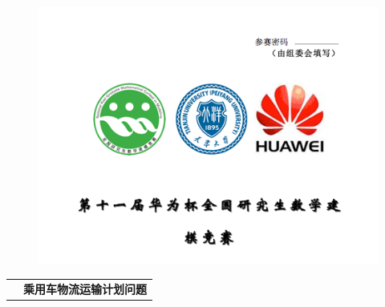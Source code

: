 \documentclass[UTF8]{ctexart}
\begin{document}


% 

\pagebreak
\begin{figure}[t]
	\includegraphics[width=\linewidth]{figure/header.png}
\end{figure}


\begin{table}[h]
\centering
\begin{tabular}{c  c} 
		{\fontsize{14pt}{\baselineskip}\selectfont 	{题目}} & 
		{\fontsize{16pt}{\baselineskip}\selectfont \textbf{乘用车物流运输计划问题}} \\\cline{2-2}
\end{tabular}

\end{table}

\FloatBarrier
\end{document}
